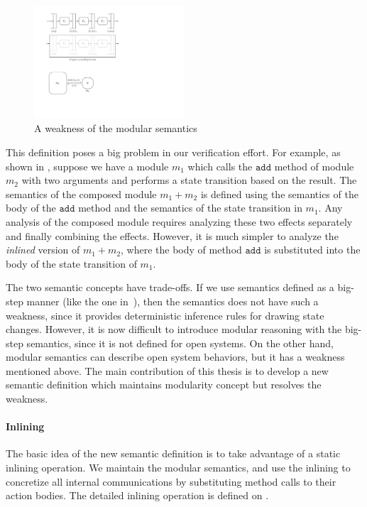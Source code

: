\begin{figure}[t]
  \centering
  \includegraphics[width=0.5\textwidth]{figures/modsem-weakness.pdf}
  \caption{A weakness of the modular semantics}
  \label{ex-modular-semantics-weakness}
\end{figure}

This definition poses a big problem in our verification effort. For
example, as shown in , suppose
we have a module $m_1$ which calls the $\texttt{add}$ method of module
$m_2$ with two arguments and performs a state transition based on the
result. The semantics of the composed module $m_1 + m_2$ is defined
using the semantics of the body of the $\texttt{add}$ method and the
semantics of the state transition in $m_1$. Any analysis of the
composed module requires analyzing these two effects separately and
finally combining the effects. However, it is much simpler to analyze
the \emph{inlined} version of $m_1 + m_2$, where the body of method
$\texttt{add}$ is substituted into the body of the state transition of
$m_1$.

The two semantic concepts have trade-offs. If we use semantics defined
as a big-step manner (like the one in~\cite{nirav-memocode}), then the
semantics does not have such a weakness, since it provides
deterministic inference rules for drawing state changes. However, it
is now difficult to introduce modular reasoning with the big-step
semantics, since it is not defined for open systems. On the other
hand, modular semantics can describe open system behaviors, but it has
a weakness mentioned above. The main contribution of this thesis is to
develop a new semantic definition which maintains modularity concept
but resolves the weakness.

\paragraph{Inlining}

The basic idea of the new semantic definition is to take advantage of
a static inlining operation. We maintain the modular semantics, and
use the inlining to concretize all internal communications by
substituting method calls to their action bodies. The detailed
inlining operation is defined on .

